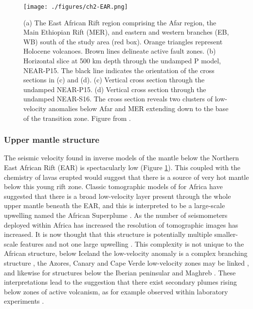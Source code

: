 \begin{figure}
    \centering
    \texttt{[image: ./figures/ch2-EAR.png]}
    \caption{(a) The East African Rift region comprising the Afar region, the Main Ethiopian Rift (MER), and eastern and western branches (EB, WB) south of the study area (red box). Orange triangles represent Holocene volcanoes. Brown lines delineate active fault zones. (b) Horizontal slice at 500 km depth through the undamped P model, NEAR-P15. The black line indicates the orientation of the cross sections in (c) and (d). (c) Vertical cross section through the undamped NEAR-P15. (d) Vertical cross section through the undamped NEAR-S16. The cross section reveals two clusters of low-velocity anomalies below Afar and MER extending down to the base of the transition zone. Figure from \cite{civiero-etal-2019}.}
    \label{fg:EAR}
\end{figure}

\subsubsection*{Upper mantle structure}

The seismic velocity found in inverse models of the mantle below the Northern East African Rift (EAR) is spectacularly low (Figure \ref{fg:EAR}). This coupled with the chemistry of lavas erupted would suggest that there is a source of very hot mantle below this young rift zone. Classic tomographic models of for Africa have suggested that there is a broad low-velocity layer present through the whole upper mantle beneath the EAR, and this is interpreted to be a large-scale upwelling named the African Superplume \citep[e.g.][]{ritsema-etal-1999}. As the number of seismometers deployed within Africa has increased the resolution of tomographic images has increased. It is now thought that this structure is potentially multiple smaller-scale features and not one large upwelling \citep{chang-2011,hammond-etal-2013,civiero-etal-2015,emry-etal-2019}. This complexity is not unique to the African structure, below Iceland the low-velocity anomaly is a complex branching structure \citep{rickers-etal-2013}, the Azores, Canary and Cape Verde low-velocity zones may be linked \citep{saki-etal-2015}, and likewise for structures below the Iberian peninsular and Maghreb \citep{civiero-etal-2018}. These interpretations lead to the suggestion that there exist secondary plumes rising below zones of active volcanism, as for example observed within laboratory experiments \citep{davaille-2005,kumagai-etal-2007}.

